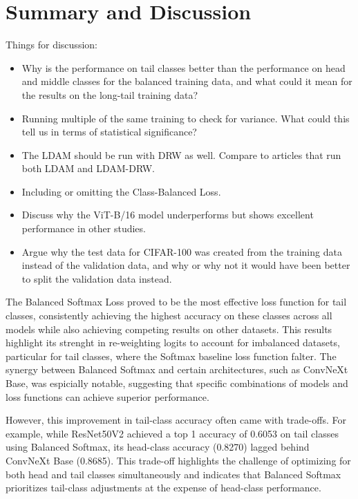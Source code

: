 
\section{Summary and Discussion}
Things for discussion:

\begin{itemize}
    \item Why is the performance on tail classes better than the performance on head and middle classes for the balanced training data, and what could it mean for the results on the long-tail training data?
    \item Running multiple of the same training to check for variance. What could this tell us in terms of statistical significance?
    \item The LDAM should be run with DRW as well. Compare to articles that run both LDAM and LDAM-DRW.
    \item Including or omitting the Class-Balanced Loss.
    \item Discuss why the ViT-B/16 model underperforms but shows excellent performance in other studies.
    \item Argue why the test data for CIFAR-100 was created from the training data instead of the validation data, and why or why not it would have been better to split the validation data instead.
\end{itemize}


The Balanced Softmax Loss proved to be the most effective loss function for tail classes, consistently achieving the highest accuracy on these classes across all models while also achieving competing results on other datasets. This results highlight its strenght in re-weighting logits to account for imbalanced datasets, particular for tail classes, where the Softmax baseline loss function falter. The synergy between Balanced Softmax and certain architectures, such as ConvNeXt Base, was espicially notable, suggesting that specific combinations of models and loss functions can achieve superior performance.

However, this improvement in tail-class accuracy often came with trade-offs. For example, while ResNet50V2 achieved a top 1 accuracy of 0.6053 on tail classes using Balanced Softmax, its head-class accuracy (0.8270) lagged behind ConvNeXt Base (0.8685). This trade-off highlights the challenge of optimizing for both head and tail classes simultaneously and indicates that Balanced Softmax prioritizes tail-class adjustments at the expense of head-class performance. 

